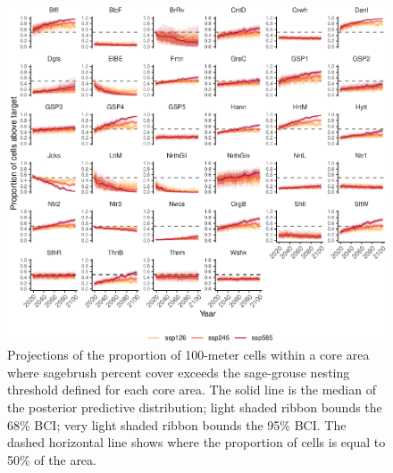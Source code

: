 \documentclass[
  12pt,
]{article}
\begin{document}
\begin{figure}
\centering
\includegraphics{sageCastManuscript_files/figure-latex/nesting-targs-1.pdf}
\caption{\label{fig:nesting-targs}Projections of the proportion of 100-meter cells within a core area where sagebrush percent cover exceeds the sage-grouse nesting threshold defined for each core area. The solid line is the median of the posterior predictive distribution; light shaded ribbon bounds the 68\% BCI; very light shaded ribbon bounds the 95\% BCI. The dashed horizontal line shows where the proportion of cells is equal to 50\% of the area.}
\end{figure}
\end{document}
